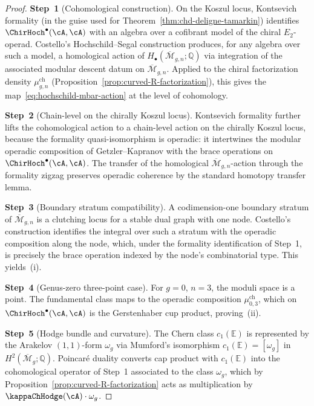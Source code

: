 \begin{proof}
\textbf{Step~1} (Cohomological construction).
On the Koszul locus, Kontsevich formality (in the guise used for
Theorem~\textup{\ref{thm:chd-deligne-tamarkin}}) identifies
$\ChirHoch^\bullet(\cA,\cA)$ with an algebra over a cofibrant model
of the chiral $E_2$-operad. Costello's Hochschild--Segal construction
produces, for any algebra over such a model, a homological action of
$H_\bullet(\overline{\mathcal{M}}_{g,n};\mathbb{Q})$ via integration
of the associated modular descent datum on
$\overline{\mathcal{M}}_{g,n}$. Applied to the chiral factorization
density $\mu^{\mathrm{ch}}_{g,n}$
(Proposition~\textup{\ref{prop:curved-R-factorization}}), this gives
the map~\eqref{eq:hochschild-mbar-action} at the level of cohomology.

\textbf{Step~2} (Chain-level on the chirally Koszul locus).
Kontsevich formality further lifts the cohomological action to a
chain-level action on the chirally Koszul locus, because the formality
quasi-isomorphism is operadic: it intertwines the modular operadic
composition of Getzler--Kapranov with the brace operations on
$\ChirHoch^\bullet(\cA,\cA)$. The transfer of the homological
$\overline{\mathcal{M}}_{g,n}$-action through the formality zigzag
preserves operadic coherence by the standard homotopy transfer lemma.

\textbf{Step~3} (Boundary stratum compatibility).
A codimension-one boundary stratum of $\overline{\mathcal{M}}_{g,n}$
is a clutching locus for a stable dual graph with one node.
Costello's construction identifies the integral over such a stratum
with the operadic composition along the node, which, under the
formality identification of Step~1, is precisely the brace operation
indexed by the node's combinatorial type. This yields~(i).

\textbf{Step~4} (Genus-zero three-point case).
For $g=0$, $n=3$, the moduli space is a point. The fundamental class
maps to the operadic composition $\mu^{\mathrm{ch}}_{0,3}$, which on
$\ChirHoch^\bullet(\cA,\cA)$ is the Gerstenhaber cup product, proving~(ii).

\textbf{Step~5} (Hodge bundle and curvature).
The Chern class $c_1(\mathbb{E})$ is represented by the Arakelov
$(1,1)$-form $\omega_g$ via Mumford's isomorphism
$c_1(\mathbb{E}) = [\omega_g]$ in $H^2(\overline{\mathcal{M}}_g;\mathbb{Q})$.
Poincar\'e duality converts cap product with $c_1(\mathbb{E})$ into
the cohomological operator of Step~1 associated to the class
$\omega_g$, which by
Proposition~\textup{\ref{prop:curved-R-factorization}} acts as
multiplication by $\kappaChHodge(\cA)\cdot\omega_g$.
\end{proof}

